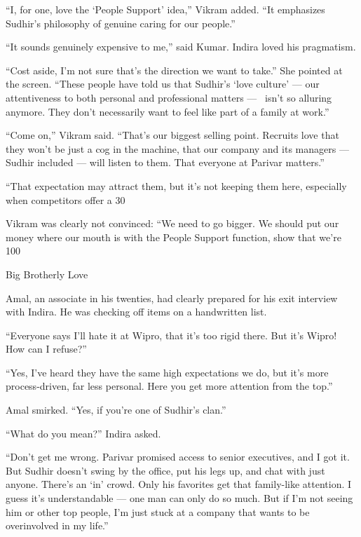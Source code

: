 \documentclass[10pt,a4paper]{book}
\begin{document}
\begin{multicols}{3}
{“I, for one, love the ‘People Support’ idea,” Vikram added. “It emphasizes Sudhir’s philosophy of genuine caring for our people.”

“It sounds genuinely expensive to me,” said Kumar. Indira loved his pragmatism.

“Cost aside, I’m not sure that’s the direction we want to take.” She pointed at the screen. “These people have told us that Sudhir’s ‘love culture’ — our attentiveness to both personal and professional matters —  isn’t so alluring anymore. They don’t necessarily want to feel like part of a family at work.”

“Come on,” Vikram said. “That’s our biggest selling point. Recruits love that they won’t be just a cog in the machine, that our company and its managers — Sudhir included — will listen to them. That everyone at Parivar matters.”

“That expectation may attract them, but it’s not keeping them here, especially when competitors offer a 30%

Vikram was clearly not convinced: “We need to go bigger. We should put our money where our mouth is with the People Support function, show that we’re 100%

Big Brotherly Love

Amal, an associate in his twenties, had clearly prepared for his exit interview with Indira. He was checking off items on a handwritten list.

“Everyone says I’ll hate it at Wipro, that it’s too rigid there. But it’s Wipro! How can I refuse?”

“Yes, I’ve heard they have the same high expectations we do, but it’s more process-driven, far less personal. Here you get more attention from the top.”

Amal smirked. “Yes, if you’re one of Sudhir’s clan.”

“What do you mean?” Indira asked.

“Don’t get me wrong. Parivar promised access to senior executives, and I got it. But Sudhir doesn’t swing by the office, put his legs up, and chat with just anyone. There’s an ‘in’ crowd. Only his favorites get that family-like attention. I guess it’s understandable — one man can only do so much. But if I’m not seeing him or other top people, I’m just stuck at a company that wants to be overinvolved in my life.”

}
\end{multicols}
\end{document}
